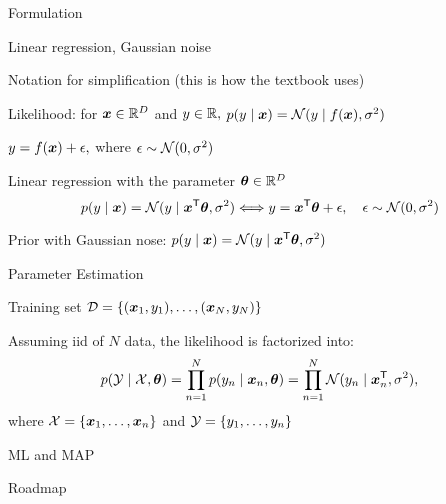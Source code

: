 \documentclass[handout,fleqn,aspectratio=169]{beamer}
\begin{document}
\begin{frame}{Formulation}

\plitemsep 0.07in

\bci 

\item Linear regression, Gaussian noise

\item Notation for simplification (this is how the textbook uses)

\item Likelihood: for $\bm{x} \in {\mathbb R}^D$ and $y \in {\mathbb R},$ $p(y \mid \bm{x}) = \mathcal N(y \mid f(\bm{x}), \sigma^2)$ 

\item $y = f(\bm{x}) + \epsilon,$ where $\epsilon \sim \mathcal N(0,\sigma^2)$

\item Linear regression with the parameter $\bm{\theta} \in {\mathbb R}^{D}$
$$
p(y \mid \bm{x}) = \mathcal N(y \mid {\bm{x}}^{\mathsf{T}}\bm{\theta}, \sigma^2) \Longleftrightarrow y = {\bm{x}}^{\mathsf{T}}\bm{\theta} + \epsilon, \quad \epsilon \sim \mathcal N(0,\sigma^2)
$$

\mycolorbox
{
Prior with Gaussian nose: $p(y \mid \bm{x}) = \mathcal N(y \mid {\bm{x}}^{\mathsf{T}}\bm{\theta}, \sigma^2)$
}

\eci
\end{frame}

\begin{frame}{Parameter Estimation}

\plitemsep 0.2in

\bci 

\item Training set $\mathcal D = \{(\bm{x}_1, y_1), \ldots, (\bm{x}_N,y_N) \}$\hspace{3cm} 

\item Assuming iid of $N$ data, the likelihood is factorized into:
$$
p(\mathcal Y \mid \mathcal X,\bm{\theta}) = \prod_{n=1}^N p(y_n \mid \bm{x}_n, \bm{\theta}) = \prod_{n=1}^N 
\mathcal N(y_n \mid {\bm{x}}^{\mathsf{T}}_n, \sigma^2),
$$
where $\mathcal X = \{\bm{x}_1,\ldots,\bm{x}_n \}$ and $\mathcal Y = \{y_1,\ldots,y_n \}$
\item ML and MAP
\eci
\end{frame}

\begin{frame}{Roadmap}

\plitemsep 0.1in

\bci 

\item  {}
\item  {} 
\item  {}

\eci
\end{frame}
\end{document}

